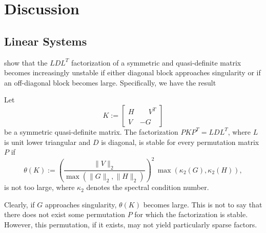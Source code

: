 \documentclass{amsart}
\begin{document}
\section{Discussion}
\label{sec:discussion}

\subsection{Linear Systems}

\cite{gill-saunders-shinnerl-1996} show that the $LDL^T$ factorization of a
symmetric and quasi-definite matrix becomes increasingly unstable if either
diagonal block approaches singularity or if an off-diagonal block becomes
large. Specifically, we have the result
\begin{btheorem}
  \label{thm:gss}
  Let
  \[
    K :=
    \begin{bmatrix}
      H & \phantom{-}V^T \\
      V & -G^{\phantom{T}}
    \end{bmatrix}
  \]
  be a symmetric quasi-definite matrix. The factorization $P K P^T = L D L^T$,
  where $L$ is unit lower triangular and $D$ is diagonal, is stable for every
  permutation matrix $P$ if
  \[
    \theta(K) :=
    \left(
      \frac{\|V\|_2}{\max(\|G\|_2, \|H\|_2)}
    \right)^2
    \,
    \max( \kappa_2(G), \kappa_2(H) ),
  \]
  is not too large, where $\kappa_2$ denotes the spectral condition number.
\end{btheorem}
Clearly, if $G$ approaches singularity, $\theta(K)$ becomes large. This is not
to say that there does not exist some permutation $P$ for which the
factorization is stable. However, this permutation, if it exists, may not yield
particularly sparse factors.
\end{document}
